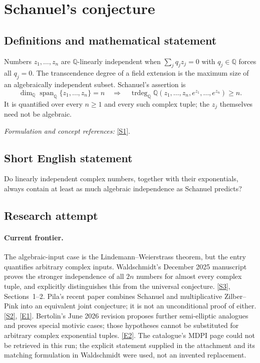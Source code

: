 \documentclass[11pt,a4paper]{article}
\newcommand{\Q}{\mathbb{Q}}
\newcommand{\sref}[2]{\hyperlink{source:#1:#2}{[S#2]}}
\newcommand{\eref}[2]{\hyperlink{extra:#1:#2}{[E#2]}}
\newif\ifshowcatalogue
\newcommand{\cataloguescope}[1]{\ifshowcatalogue
 \paragraph{Exact scope in the supplied catalogue.}
 \begin{quote}\small #1\end{quote}\fi}
\numberwithin{equation}{section}
\begin{document}
\setcounter{section}{27}
\clearpage
\section{\texorpdfstring{Schanuel's conjecture}{Schanuel's conjecture}}\label{28}
\subsection{Definitions and mathematical statement}
Numbers $z_1,\ldots,z_n$ are $\Q$-linearly independent when $\sum_jq_jz_j=0$ with $q_j\in\Q$ forces all $q_j=0$. The transcendence degree of a field extension is the maximum size of an algebraically independent subset. Schanuel's assertion is
\[
 \dim_{\Q}\operatorname{span}_{\Q}\{z_1,\ldots,z_n\}=n
 \quad\Longrightarrow\quad
 \operatorname{trdeg}_{\Q}\Q(z_1,\ldots,z_n,e^{z_1},\ldots,e^{z_n})\ge n.
\]
It is quantified over every $n\ge1$ and every such complex tuple; the $z_j$ themselves need not be algebraic.
\par\smallskip\textit{Formulation and concept references:} \sref{28}{1}.
\cataloguescope{Prove or disprove that if z\_1,...,z\_n in C are linearly independent over Q, then the field Q(z\_1,...,z\_n,e\textasciicircum{}\{z\_1\},...,e\textasciicircum{}\{z\_n\}) has transcendence degree at least n over Q.}
\subsection{Short English statement}
Do linearly independent complex numbers, together with their exponentials, always contain at least as much algebraic independence as Schanuel predicts?
\subsection{Research attempt}

\paragraph{Current frontier.}
The algebraic-input case is the Lindemann--Weierstrass theorem, but the
entry quantifies arbitrary complex inputs. Waldschmidt's December 2025
manuscript proves the stronger independence of all $2n$ numbers for
almost every complex tuple, and explicitly distinguishes this from the
universal conjecture. \sref{28}{3}, Sections~1--2. Pila's recent paper
combines Schanuel and multiplicative Zilber--Pink into an equivalent joint
conjecture; it is not an unconditional proof of either. \sref{28}{2},
\eref{28}{1}. Bertolin's June 2026 revision proposes further
semi-elliptic analogues and proves special motivic cases; those hypotheses
cannot be substituted for arbitrary complex exponential tuples.
\eref{28}{2}. The catalogue's MDPI page could not be retrieved in this
run; the explicit statement supplied in the attachment and its matching
formulation in Waldschmidt were used, not an invented replacement.
\end{document}
